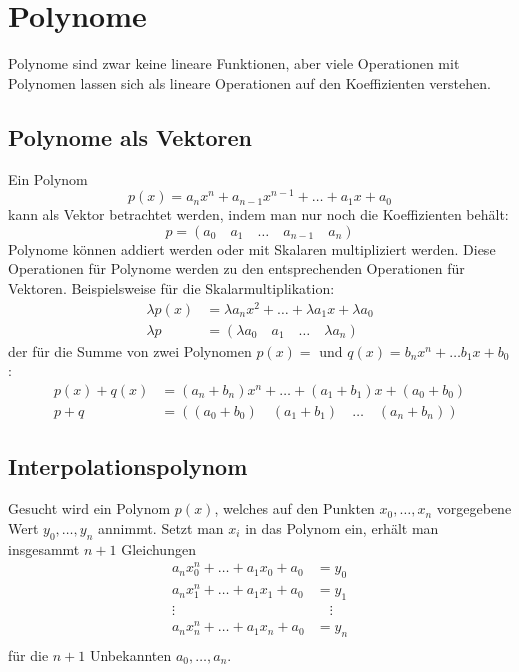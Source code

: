 \chapter{Polynome\label{chapter-polynome}}
Polynome sind zwar keine lineare Funktionen, aber viele 
Operationen mit Polynomen lassen sich als lineare Operationen
auf den Koeffizienten verstehen.

\section{Polynome als Vektoren}
Ein Polynom 
$$p(x)=a_nx^n+a_{n-1}x^{n-1}+\dots+a_1x +a_0$$
kann als Vektor betrachtet werden, indem man nur noch die Koeffizienten
behält:
$$p=(
a_0\quad a_1\quad \dots\quad a_{n-1}\quad a_n
)
$$
Polynome können addiert werden oder mit Skalaren multipliziert
werden.
Diese Operationen für Polynome werden zu den entsprechenden Operationen
für Vektoren.
Beispielsweise für die Skalarmultiplikation:
\begin{align*}
\lambda p(x)&=\lambda a_nx^2+\dots +\lambda a_1x+\lambda a_0
\\
\lambda p&=(\lambda a_0\quad a_1\quad \dots\quad \lambda a_n)
\end{align*}
der für die Summe von zwei Polynomen
$p(x)=$ und $q(x)=b_nx^n+\dots b_1x+b_0$:
\begin{align*}
p(x)+q(x)&=(a_n+b_n)x^n+\dots+(a_1+b_1)x+(a_0+b_0)\\
p+q&=((a_0+b_0)\quad(a_1+b_1)\quad\dots\quad (a_n+b_n))
\end{align*}

\section{Interpolationspolynom}
Gesucht wird ein Polynom $p(x)$, welches auf den Punkten $x_0,\dots,x_n$
vorgegebene Wert $y_0,\dots,y_n$ annimmt.
Setzt man $x_i$ in das Polynom
ein, erhält man insgesammt $n+1$ Gleichungen
\begin{align*}
a_nx_0^n+\dots+a_1x_0+a_0&=y_0\\
a_nx_1^n+\dots+a_1x_1+a_0&=y_1\\
\vdots&\quad\vdots\\
a_nx_n^n+\dots+a_1x_n+a_0&=y_n\\
\end{align*}
für die $n+1$ Unbekannten $a_0,\dots,a_n$.




